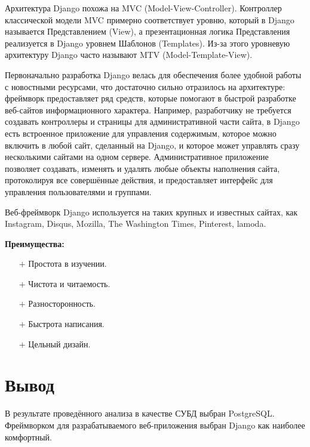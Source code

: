 Архитектура Django похожа на MVC (Model-View-Controller).
Контроллер классической модели MVC примерно соответствует уровню, который в Django называется Представлением (View), а презентационная логика Представления реализуется в Django уровнем Шаблонов (Templates).
Из-за этого уровневую архитектуру Django часто называют MTV (Model-Template-View).

Первоначально разработка Django велась для обеспечения более удобной работы с новостными ресурсами, что достаточно сильно отразилось на архитектуре: фреймворк предоставляет ряд средств, которые помогают в быстрой разработке веб-сайтов информационного характера.
Например, разработчику не требуется создавать контроллеры и страницы для административной части сайта, в Django есть встроенное приложение для управления содержимым, которое можно включить в любой сайт, сделанный на Django, и которое может управлять сразу несколькими сайтами на одном сервере.
Административное приложение позволяет создавать, изменять и удалять любые объекты наполнения сайта, протоколируя все совершённые действия, и предоставляет интерфейс для управления пользователями и группами.

Веб-фреймворк Django используется на таких крупных и известных сайтах, как Instagram, Disqus, Mozilla, The Washington Times, Pinterest, lamoda.

\textbf{Преимущества:}
\begin{itemize}
	\item[$+$] Простота в изучении.
	\item[$+$] Чистота и читаемость.
	\item[$+$] Разносторонность.
	\item[$+$] Быстрота написания.
	\item[$+$] Цельный дизайн.
\end{itemize}

\section*{Вывод}

В результате проведённого анализа в качестве СУБД выбран PostgreSQL.
Фреймворком для разрабатываемого веб-приложения выбран Django как наиболее комфортный.
